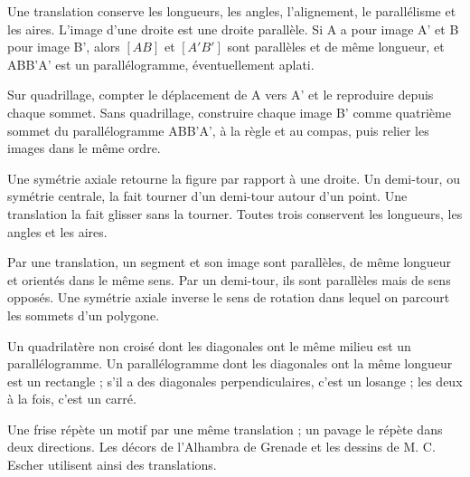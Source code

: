 \begin{propriete}Une translation conserve les longueurs, les angles, l’alignement, le parallélisme et les aires. L’image d’une droite est une droite parallèle. Si A a pour image A’ et B pour image B’, alors $[AB]$ et $[A'B']$ sont parallèles et de même longueur, et ABB’A’ est un parallélogramme, éventuellement aplati.\end{propriete}
\begin{savoirfaire}Sur quadrillage, compter le déplacement de A vers A’ et le reproduire depuis chaque sommet. Sans quadrillage, construire chaque image B’ comme quatrième sommet du parallélogramme ABB’A’, à la règle et au compas, puis relier les images dans le même ordre.\end{savoirfaire}
\clearpage
{}\label{cours-13-2}
\begin{definition}Une symétrie axiale retourne la figure par rapport à une droite. Un demi-tour, ou symétrie centrale, la fait tourner d’un demi-tour autour d’un point. Une translation la fait glisser sans la tourner. Toutes trois conservent les longueurs, les angles et les aires.\end{definition}
\begin{savoirfaire}[Distinguer]Par une translation, un segment et son image sont parallèles, de même longueur et orientés dans le même sens. Par un demi-tour, ils sont parallèles mais de sens opposés. Une symétrie axiale inverse le sens de rotation dans lequel on parcourt les sommets d’un polygone.\end{savoirfaire}
\begin{propriete}Un quadrilatère non croisé dont les diagonales ont le même milieu est un parallélogramme. Un parallélogramme dont les diagonales ont la même longueur est un rectangle ; s’il a des diagonales perpendiculaires, c’est un losange ; les deux à la fois, c’est un carré.\end{propriete}
\begin{exemple}Une frise répète un motif par une même translation ; un pavage le répète dans deux directions. Les décors de l’Alhambra de Grenade et les dessins de M. C. Escher utilisent ainsi des translations.\end{exemple}

